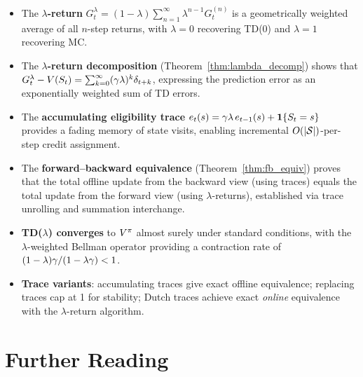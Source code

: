 \documentclass[11pt,a4paper]{article}
\begin{document}
\begin{itemize}
  \item The \textbf{$\lambda$-return}
    $G_t^\lambda = (1-\lambda)\sum_{n=1}^\infty \lambda^{n-1}
    G_t^{(n)}$ is a geometrically weighted average of all $n$-step
    returns, with $\lambda = 0$ recovering TD(0) and $\lambda = 1$
    recovering MC.

  \item The \textbf{$\lambda$-return decomposition}
    (Theorem~\ref{thm:lambda_decomp}) shows that
    $G_t^\lambda - V(S_t) = \sum_{k=0}^\infty
    (\gamma\lambda)^k \delta_{t+k}$, expressing the prediction
    error as an exponentially weighted sum of TD errors.

  \item The \textbf{accumulating eligibility trace}
    $e_t(s) = \gamma\lambda\,e_{t-1}(s) + \mathbf{1}\{S_t = s\}$
    provides a fading memory of state visits, enabling incremental
    $O(|\mathcal{S}|)$-per-step credit assignment.

  \item The \textbf{forward--backward equivalence}
    (Theorem~\ref{thm:fb_equiv}) proves that the total offline update
    from the backward view (using traces) equals the total update from
    the forward view (using $\lambda$-returns), established via trace
    unrolling and summation interchange.

  \item \textbf{TD($\lambda$) converges} to $V^{\pi}$ almost surely under
    standard conditions, with the $\lambda$-weighted Bellman operator
    providing a contraction rate of
    $(1-\lambda)\gamma/(1-\lambda\gamma) < 1$.

  \item \textbf{Trace variants}: accumulating traces give exact offline
    equivalence; replacing traces cap at 1 for stability; Dutch traces
    achieve exact \emph{online} equivalence with the $\lambda$-return
    algorithm.
\end{itemize}

\section{Further Reading}
\label{sec:further_reading}
\end{document}
